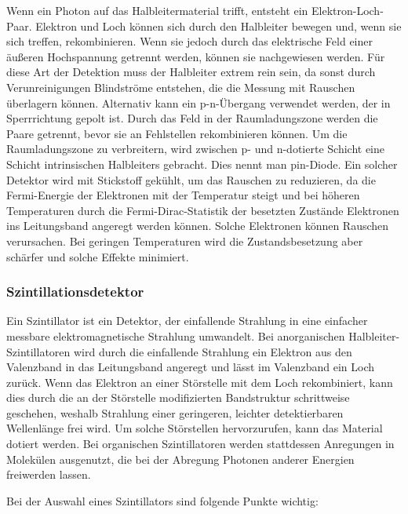 \documentclass[
	a4paper,
	12pt,
	pagesize,
	ngerman
]{scrartcl}
\begin{document}
	Wenn ein Photon auf das Halbleitermaterial trifft, entsteht ein Elektron-Loch-Paar.
	Elektron und Loch können sich durch den Halbleiter bewegen und, wenn sie sich treffen, rekombinieren.
	Wenn sie jedoch durch das elektrische Feld einer äußeren Hochspannung getrennt werden, können sie nachgewiesen werden.
	Für diese Art der Detektion muss der Halbleiter extrem rein sein, da sonst durch Verunreinigungen Blindströme entstehen, die die Messung mit Rauschen überlagern können.
	Alternativ kann ein p-n-Übergang verwendet werden, der in Sperrrichtung gepolt ist.
	Durch das Feld in der Raumladungszone werden die Paare getrennt, bevor sie an Fehlstellen rekombinieren können.
	Um die Raumladungszone zu verbreitern, wird zwischen p- und n-dotierte Schicht eine Schicht intrinsischen Halbleiters gebracht.
	Dies nennt man pin-Diode.
	Ein solcher Detektor wird mit Stickstoff gekühlt, um das Rauschen zu reduzieren, da die Fermi-Energie der Elektronen mit der Temperatur steigt und bei höheren Temperaturen durch die Fermi-Dirac-Statistik der besetzten Zustände Elektronen ins Leitungsband angeregt werden können.
	Solche Elektronen können Rauschen verursachen.
	Bei geringen Temperaturen wird die Zustandsbesetzung aber schärfer und solche Effekte minimiert.

	\subsubsection{Szintillationsdetektor} %

	Ein Szintillator ist ein Detektor, der einfallende Strahlung in eine einfacher messbare elektromagnetische Strahlung umwandelt.
	Bei anorganischen Halbleiter-Szintillatoren wird durch die einfallende Strahlung ein Elektron aus den Valenzband in das Leitungsband angeregt und lässt im Valenzband ein Loch zurück.
	Wenn das Elektron an einer Störstelle mit dem Loch rekombiniert, kann dies durch die an der Störstelle modifizierten Bandstruktur schrittweise geschehen, weshalb Strahlung einer geringeren, leichter detektierbaren Wellenlänge frei wird.
	Um solche Störstellen hervorzurufen, kann das Material dotiert werden.
	Bei organischen Szintillatoren werden stattdessen Anregungen in Molekülen ausgenutzt, die bei der Abregung Photonen anderer Energien freiwerden lassen.

	Bei der Auswahl eines Szintillators sind folgende Punkte wichtig:
\end{document}
